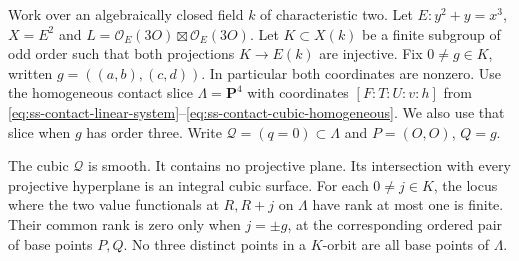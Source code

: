 Work over an algebraically closed field $k$ of characteristic two.
Let $E:y^2+y=x^3$, $X=E^2$ and
$L=\mathcal O_E(3O)\boxtimes\mathcal O_E(3O)$.
Let $K\subset X(k)$ be a finite subgroup of odd order such that both
projections $K\to E(k)$ are injective. Fix $0\ne g\in K$, written
$g=((a,b),(c,d))$. In particular both coordinates are nonzero.
Use the homogeneous contact slice $\Lambda=\mathbf P^4$ with coordinates
$[F:T:U:v:h]$ from
\eqref{eq:ss-contact-linear-system}--\eqref{eq:ss-contact-cubic-homogeneous}.
We also use that slice when $g$ has order three. Write
$\mathcal Q=(q=0)\subset\Lambda$ and $P=(O,O)$, $Q=g$.

\begin{lemma}
\label{lem:ss-contact-cubic-evaluation}
The cubic $\mathcal Q$ is smooth. It contains no projective plane.
Its intersection with every projective hyperplane is an integral
cubic surface. For each $0\ne j\in K$, the locus where the two value
functionals at $R,R+j$ on $\Lambda$ have rank at most one is finite.
Their common rank is zero only when $j=\pm g$, at the corresponding
ordered pair of base points $P,Q$. No three distinct points in a
$K$-orbit are all base points of $\Lambda$.
\end{lemma}
